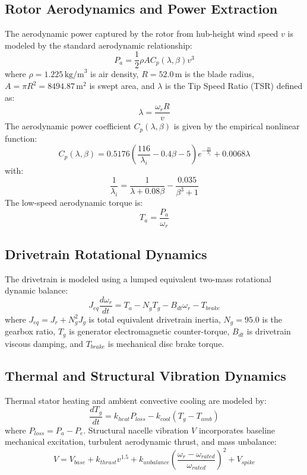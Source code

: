 \documentclass[11pt,a4paper]{article}
\begin{document}
\subsection{Rotor Aerodynamics and Power Extraction}
The aerodynamic power captured by the rotor from hub-height wind speed $v$ is modeled by the standard aerodynamic relationship:
\begin{equation}
    P_a = \frac{1}{2} \rho A C_p(\lambda, \beta) v^3
\end{equation}
where $\rho = 1.225\,\text{kg/m}^3$ is air density, $R = 52.0\,\text{m}$ is the blade radius, $A = \pi R^2 = 8494.87\,\text{m}^2$ is swept area, and $\lambda$ is the Tip Speed Ratio (TSR) defined as:
\begin{equation}
    \lambda = \frac{\omega_r R}{v}
\end{equation}
The aerodynamic power coefficient $C_p(\lambda, \beta)$ is given by the empirical nonlinear function:
\begin{equation}
    C_p(\lambda, \beta) = 0.5176 \left( \frac{116}{\lambda_i} - 0.4\beta - 5 \right) e^{-\frac{21}{\lambda_i}} + 0.0068\lambda
\end{equation}
with:
\begin{equation}
    \frac{1}{\lambda_i} = \frac{1}{\lambda + 0.08\beta} - \frac{0.035}{\beta^3 + 1}
\end{equation}
The low-speed aerodynamic torque is:
\begin{equation}
    T_a = \frac{P_a}{\omega_r}
\end{equation}

\subsection{Drivetrain Rotational Dynamics}
The drivetrain is modeled using a lumped equivalent two-mass rotational dynamic balance:
\begin{equation}
    J_{eq} \frac{d\omega_r}{dt} = T_a - N_g T_g - B_{dt} \omega_r - T_{brake}
\end{equation}
where $J_{eq} = J_r + N_g^2 J_g$ is total equivalent drivetrain inertia, $N_g = 95.0$ is the gearbox ratio, $T_g$ is generator electromagnetic counter-torque, $B_{dt}$ is drivetrain viscous damping, and $T_{brake}$ is mechanical disc brake torque.

\subsection{Thermal and Structural Vibration Dynamics}
Thermal stator heating and ambient convective cooling are modeled by:
\begin{equation}
    \frac{dT_g}{dt} = k_{heat} P_{loss} - k_{cool} (T_g - T_{amb})
\end{equation}
where $P_{loss} = P_a - P_e$. Structural nacelle vibration $V$ incorporates baseline mechanical excitation, turbulent aerodynamic thrust, and mass unbalance:
\begin{equation}
    V = V_{base} + k_{thrust} v^{1.5} + k_{unbalance} \left(\frac{\omega_r - \omega_{rated}}{\omega_{rated}}\right)^2 + V_{spike}
\end{equation}
\end{document}
